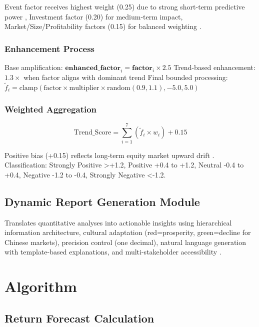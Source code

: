 \documentclass[3p,times,procedia]{elsarticle}
\begin{document}
Event factor receives highest weight (0.25) due to strong short-term predictive power \cite{Ding2015,Daniel1998}, Investment factor (0.20) for medium-term impact, Market/Size/Profitability factors (0.15) for balanced weighting \cite{FAMA1993,Carhart1997}.

\subsubsection{{Enhancement Process}}

Base amplification: $\textbf{enhanced\_factor}_i = \textbf{factor}_i \times 2.5$
Trend-based enhancement: $1.3\times$ when factor aligns with dominant trend \cite{Lo2004}
Final bounded processing: $\tilde{f}_i = \text{clamp}(\text{factor} \times \text{multiplier} \times \text{random}(0.9,1.1), -5.0, 5.0)$

\subsubsection{{Weighted Aggregation}}

\begin{equation}
\text{Trend\_Score} = \sum_{i=1}^{7} \left(\tilde{f}_i \times w_i\right) + 0.15
\end{equation}

Positive bias (+0.15) reflects long-term equity market upward drift \cite{Fama1965}. Classification: Strongly Positive >+1.2, Positive +0.4 to +1.2, Neutral -0.4 to +0.4, Negative -1.2 to -0.4, Strongly Negative <-1.2.

\subsection{Dynamic Report Generation Module}

Translates quantitative analyses into actionable insights using hierarchical information architecture, cultural adaptation (red=prosperity, green=decline for Chinese markets), precision control (one decimal), natural language generation with template-based explanations, and multi-stakeholder accessibility \cite{Ribeiro2016,Harvey2016}.

\vspace{0.10cm}
\section{Algorithm}

\subsection{Return Forecast Calculation}
\end{document}
